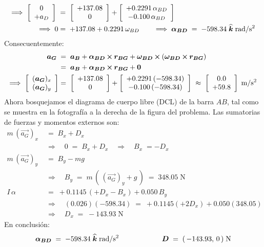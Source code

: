 \documentclass[ a4paper, twoside, 11pt]{article}
\begin{document}
\begin{problem}
\begin{align*}
\Longrightarrow \; \left[ \begin{array}{c} 0 \\ +a_D \end{array} \right] \;
& = \; \left[ \begin{array}{c} +137.08 \\ 0 \end{array} \right] +
\left[ \begin{array}{c}  +0.2291 \, \alpha_{BD} \\  -0.100 \, \alpha_{BD} \end{array} \right] \\
\Longrightarrow \; 0 & = \; +137.08 + 0.2291 \, \omega_{BD} \qquad
\Longrightarrow \; {\boldsymbol{\alpha_{BD}}} \; = \; -598.34 \; {\boldsymbol{\widehat{k}}} \; \text{rad/s\ensuremath{^{\text{2}}}}
\end{align*}
Consecuentemente: 
\begin{align*}
{\boldsymbol{a_G}} \;
& = \; {\boldsymbol{a_B}} + {\boldsymbol{\alpha_{BD}}} \,{\boldsymbol{\times}}\, {\boldsymbol{r_{BG}}} + {\boldsymbol{\omega_{BD}}} \,{\boldsymbol{\times}}\, ( {\boldsymbol{\omega_{BD}}} \,{\boldsymbol{\times}}\, {\boldsymbol{r_{BG}}} ) \\
& = \; {\boldsymbol{a_B}} + {\boldsymbol{\alpha_{BD}}} \,{\boldsymbol{\times}}\, {\boldsymbol{r_{BG}}} + {\boldsymbol{0}} \\
\Longrightarrow \; 
\left[ \begin{array}{c}  ({\boldsymbol{a_G}})_x \\  ({\boldsymbol{a_G}})_y \end{array} \right] & =
\; \left[ \begin{array}{c} +137.08 \\ 0 \end{array} \right] +
\left[ \begin{array}{c}  +0.2291 \, (-598.34) \\  -0.100 \, (-598.34) \end{array} \right] \; \approx \; \left[ \begin{array}{c} 0.0 \\ +59.8 \end{array} \right] \; \text{m/s\ensuremath{^{\text{2}}}}
\end{align*}
Ahora bosquejamos el diagrama de cuerpo libre (DCL) de la barra $AB$, tal como se muestra en la fotograf\'ia a la derecha de la figura del problema. Las sumatorias de fuerzas y momentos externos son: 
\begin{align*}
m \, (\vec{a_G})_x \; & = \; B_x + D_x \\
& \Longrightarrow \quad 0 \; = \; B_x + D_x
\quad \Longrightarrow \quad B_x \; = -D_x \\
m \, (\vec{a_G})_y \; & = \; B_y - mg \\
& \Longrightarrow \quad
B_y \; = \; m \, ( \, (\vec{a_G})_y + g \, )
\; = \; 348.05 \; \text{N} \\
I \, \alpha \; & = \; +0.1145 \, ( +D_x - B_x ) + 0.050 \, B_y \\
& \Longrightarrow \quad
(0.026)(-598.34) \; = \; +0.1145(+2 D_x) + 0.050 (348.05) \\
& \Longrightarrow \quad
D_x \; = \; -143.93 \; \text{N}
\end{align*}
En conclusi\'on: 
\[
{\boldsymbol{\alpha_{BD}}} \; = \; -598.34 \; {\boldsymbol{\widehat{k}}} \; \text{rad/s\ensuremath{^{\text{2}}}}
\qquad \qquad \qquad
{\boldsymbol{D}} \; = \; ( \, -143.93, \, 0 \, ) \; \text{N}
\]
\QED

\end{problem}
\fullskip
\end{document}

